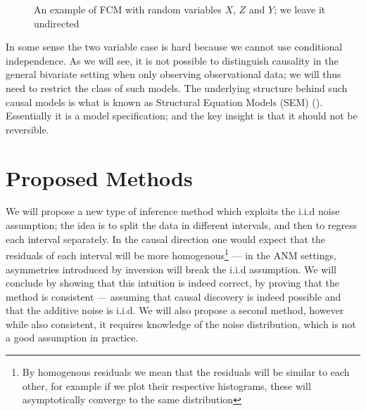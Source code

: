 \begin{figure}[!h]
    \centering

    \caption{An example of FCM with random variables $X$, $Z$ and $Y$; we leave it undirected}
    \label{fig:conditionalIndep}

\end{figure}

In some sense the two variable case is hard because we cannot use conditional independence. As we will see, 
it is not possible to distinguish causality in the general bivariate setting when only observing 
observational data; we will thus need to restrict 
the class of such models. The underlying structure behind such causal models is what is known as 
Structural Equation Models (SEM) (\cite{Peters2017}). Essentially 
it is a model specification; and the key insight is that it should not be reversible. 


\section{Proposed Methods}

We will propose a new type of inference method which exploits the i.i.d 
noise assumption; the idea is to split the data in different intervals, and then to regress each 
interval separately. In the causal direction one would expect that the residuals of each 
interval will be more homogenous\footnote{By homogenous residuals we mean that the residuals will be similar 
to each other, for example if we plot their respective histograms, these will asymptotically converge to the 
same distribution}  --- in the ANM settings, asymmetries introduced
by inversion will break the i.i.d assumption. We will conclude by 
showing that this intuition is indeed correct, by proving that the method is consistent --- 
assuming that causal discovery is indeed possible and that the additive noise is i.i.d. We will
also propose a second method, however while also consistent, it requires knowledge of the 
noise distribution, which is not a good assumption in practice. 


